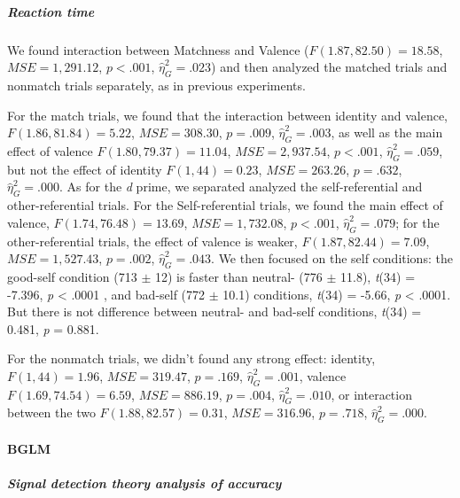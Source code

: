 \documentclass[
  english,
  man]{apa6}
\let\oldparagraph\paragraph
\renewcommand{\paragraph}[1]{\oldparagraph{#1}\mbox{}}
\let\oldsubparagraph\subparagraph
\renewcommand{\subparagraph}[1]{\oldsubparagraph{#1}\mbox{}}
\begin{document}
\hypertarget{reaction-time-12}{%
\subparagraph{Reaction time}\label{reaction-time-12}}

We found interaction between Matchness and Valence (\(F(1.87, 82.50) = 18.58\), \(\mathit{MSE} = 1,291.12\), \(p < .001\), \(\hat{\eta}^2_G = .023\)) and then analyzed the matched trials and nonmatch trials separately, as in previous experiments.

For the match trials, we found that the interaction between identity and valence, \(F(1.86, 81.84) = 5.22\), \(\mathit{MSE} = 308.30\), \(p = .009\), \(\hat{\eta}^2_G = .003\), as well as the main effect of valence \(F(1.80, 79.37) = 11.04\), \(\mathit{MSE} = 2,937.54\), \(p < .001\), \(\hat{\eta}^2_G = .059\), but not the effect of identity \(F(1, 44) = 0.23\), \(\mathit{MSE} = 263.26\), \(p = .632\), \(\hat{\eta}^2_G = .000\). As for the \emph{d} prime, we separated analyzed the self-referential and other-referential trials. For the Self-referential trials, we found the main effect of valence, \(F(1.74, 76.48) = 13.69\), \(\mathit{MSE} = 1,732.08\), \(p < .001\), \(\hat{\eta}^2_G = .079\); for the other-referential trials, the effect of valence is weaker, \(F(1.87, 82.44) = 7.09\), \(\mathit{MSE} = 1,527.43\), \(p = .002\), \(\hat{\eta}^2_G = .043\). We then focused on the self conditions: the good-self condition (713 \(\pm\) 12) is faster than neutral- (776 \(\pm\) 11.8), \emph{t}(34) = -7.396, \emph{p} \textless{} .0001 , and bad-self (772 \(\pm\) 10.1) conditions, \emph{t}(34) = -5.66, \emph{p} \textless{} .0001. But there is not difference between neutral- and bad-self conditions, \emph{t}(34) = 0.481, \emph{p} = 0.881.

For the nonmatch trials, we didn't found any strong effect: identity, \(F(1, 44) = 1.96\), \(\mathit{MSE} = 319.47\), \(p = .169\), \(\hat{\eta}^2_G = .001\), valence \(F(1.69, 74.54) = 6.59\), \(\mathit{MSE} = 886.19\), \(p = .004\), \(\hat{\eta}^2_G = .010\), or interaction between the two \(F(1.88, 82.57) = 0.31\), \(\mathit{MSE} = 316.96\), \(p = .718\), \(\hat{\eta}^2_G = .000\).

\hypertarget{bglm-6}{%
\paragraph{BGLM}\label{bglm-6}}

\hypertarget{signal-detection-theory-analysis-of-accuracy-8}{%
\subparagraph{Signal detection theory analysis of accuracy}\label{signal-detection-theory-analysis-of-accuracy-8}}
\end{document}
